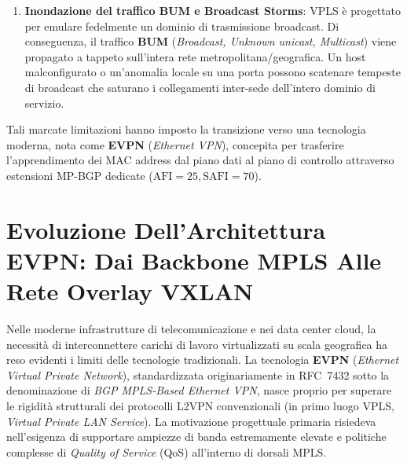 \documentclass[11pt, a4paper]{article}
\begin{document}
\begin{enumerate}
    \item \textbf{Inondazione del traffico BUM e Broadcast Storms}:
    VPLS è progettato per emulare fedelmente un dominio di trasmissione broadcast. Di conseguenza, il traffico \textbf{BUM} (\emph{Broadcast, Unknown unicast, Multicast}) viene propagato a tappeto sull'intera rete metropolitana/geografica. Un host malconfigurato o un'anomalia locale su una porta possono scatenare tempeste di broadcast che saturano i collegamenti inter-sede dell'intero dominio di servizio.
\end{enumerate}

Tali marcate limitazioni hanno imposto la transizione verso una tecnologia moderna, nota come \textbf{EVPN} (\emph{Ethernet VPN}), concepita per trasferire l'apprendimento dei MAC address dal piano dati al piano di controllo attraverso estensioni MP-BGP dedicate ($\text{AFI}=25, \text{SAFI}=70$).



\section{Evoluzione Dell'Architettura EVPN: Dai Backbone MPLS Alle Rete Overlay VXLAN}

Nelle moderne infrastrutture di telecomunicazione e nei data center cloud, la necessità di interconnettere carichi di lavoro virtualizzati su scala geografica ha reso evidenti i limiti delle tecnologie tradizionali. La tecnologia \textbf{EVPN} (\emph{Ethernet Virtual Private Network}), standardizzata originariamente in RFC~7432 sotto la denominazione di \emph{BGP MPLS-Based Ethernet VPN}, nasce proprio per superare le rigidità strutturali dei protocolli L2VPN convenzionali (in primo luogo VPLS, \emph{Virtual Private LAN Service}). La motivazione progettuale primaria risiedeva nell'esigenza di supportare ampiezze di banda estremamente elevate e politiche complesse di \emph{Quality of Service} (QoS) all'interno di dorsali MPLS.
\end{document}
